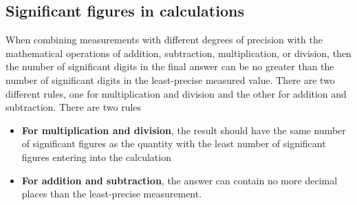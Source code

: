 \documentclass{report}
\begin{document}
    \subsection{Significant figures in calculations}
    \bigbreak \noindent 
    When combining measurements with different degrees of precision with the mathematical operations of addition, subtraction, multiplication, or division, then the number of significant digits in the final answer can be no greater than the number of significant digits in the least-precise measured value. There are two different rules, one for multiplication and division and the other for addition and subtraction. There are two rules
    \begin{itemize}
        \item \textbf{For multiplication and division}, the result should have the same number of significant figures as the quantity with the least number of significant figures entering into the calculation 
        \item \textbf{For addition and subtraction}, the answer can contain no more decimal places than the least-precise measurement.
    \end{itemize}





    







    
    









    
\end{document}
